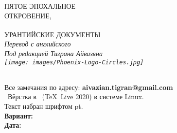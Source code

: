 \makeatletter
{}%
\makeatother

\begin{center}
{%
\bibcovertitlefont
\titlefontsize
ПЯТОЕ ЭПОХАЛЬНОЕ\\
ОТКРОВЕНИЕ,\\
\\[2pt]
\titlefontsize
УРАНТИЙСКИЕ ДОКУМЕНТЫ\\
}%
\itshape
Перевод с английского\\
Под редакцией Тиграна Айвазяна\\
\texttt{[image: images/Phoenix-Logo-Circles.jpg]}\\
\titlesepbig\\
\end{center}

\titleframe

\newpage

\begin{center}
\begin{center}\end{center}
\parbox{0.9\linewidth}{\centering
Все замечания по адресу: {\makeatletter\upshape\bfseries aivazian.tigran@gmail.com\makeatother}\\[1ex]
\tux\ Вёрстка в \XeLaTeX\ (\TeX\ Live 2020) в системе Linux.\\
Текст набран шрифтом \textbf{\itshape{}\urantiamainfont} \urantiamainfontsize pt.\\[5pt]
\upshape\normalsize\bfseries Вариант: \\
\upshape\bfseries Дата: \mytoday{}\\
}
\end{center}

\titleframe
